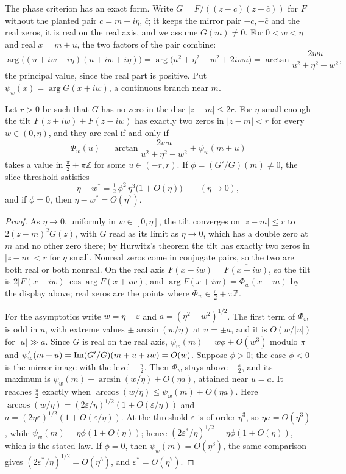 The phase criterion has an exact form. Write $G=F/((z-c)(z-\bar c))$ for $F$ without the planted pair $c=m+i\eta$, $\bar c$; it keeps the mirror pair $-c,-\bar c$ and the real zeros, it is real on the real axis, and we assume $G(m)\ne0$. For $0<w<\eta$ and real $x=m+u$, the two factors of the pair combine:
\[
\arg\big((u+iw-i\eta)(u+iw+i\eta)\big)=\arg\big(u^2+\eta^2-w^2+2iwu\big)=\arctan\frac{2wu}{u^2+\eta^2-w^2},
\]
the principal value, since the real part is positive. Put $\psi_w(x)=\arg G(x+iw)$, a continuous branch near $m$.

\begin{theorem}\label{cm:thm:exact}
Let $r>0$ be such that $G$ has no zero in the disc $|z-m|\le2r$. For $\eta$ small enough the tilt $F(z+iw)+F(z-iw)$ has exactly two zeros in $|z-m|<r$ for every $w\in(0,\eta)$, and they are real if and only if
\[
\Phi_w(u)=\arctan\frac{2wu}{u^2+\eta^2-w^2}+\psi_w(m+u)
\]
takes a value in $\frac\pi2+\pi\mathbb Z$ for some $u\in(-r,r)$. If $\phi=(G'/G)(m)\ne0$, the slice threshold satisfies
\[
\eta-w^*=\tfrac12\,\phi^2\,\eta^3\big(1+O(\eta)\big)\qquad(\eta\to0),
\]
and if $\phi=0$, then $\eta-w^*=O(\eta^7)$.
\end{theorem}

\begin{proof}
As $\eta\to0$, uniformly in $w\in[0,\eta]$, the tilt converges on $|z-m|\le r$ to $2(z-m)^2G(z)$, with $G$ read as its limit as $\eta\to0$, which has a double zero at $m$ and no other zero there; by Hurwitz's theorem the tilt has exactly two zeros in $|z-m|<r$ for $\eta$ small. Nonreal zeros come in conjugate pairs, so the two are both real or both nonreal. On the real axis $F(x-iw)=\overline{F(x+iw)}$, so the tilt is $2|F(x+iw)|\cos\arg F(x+iw)$, and $\arg F(x+iw)=\Phi_w(x-m)$ by the display above; real zeros are the points where $\Phi_w\in\frac\pi2+\pi\mathbb Z$.

For the asymptotics write $w=\eta-\varepsilon$ and $a=(\eta^2-w^2)^{1/2}$. The first term of $\Phi_w$ is odd in $u$, with extreme values $\pm\arcsin(w/\eta)$ at $u=\pm a$, and it is $O(w/|u|)$ for $|u|\gg a$. Since $G$ is real on the real axis, $\psi_w(m)=w\phi+O(w^3)$ modulo $\pi$ and $\psi_w'(m+u)=\operatorname{Im}(G'/G)(m+u+iw)=O(w)$. Suppose $\phi>0$; the case $\phi<0$ is the mirror image with the level $-\frac\pi2$. Then $\Phi_w$ stays above $-\frac\pi2$, and its maximum is $\psi_w(m)+\arcsin(w/\eta)+O(\eta a)$, attained near $u=a$. It reaches $\frac\pi2$ exactly when $\arccos(w/\eta)\le\psi_w(m)+O(\eta a)$. Here $\arccos(w/\eta)=(2\varepsilon/\eta)^{1/2}(1+O(\varepsilon/\eta))$ and $a=(2\eta\varepsilon)^{1/2}(1+O(\varepsilon/\eta))$. At the threshold $\varepsilon$ is of order $\eta^3$, so $\eta a=O(\eta^3)$, while $\psi_w(m)=\eta\phi(1+O(\eta))$; hence $(2\varepsilon^*/\eta)^{1/2}=\eta\phi(1+O(\eta))$, which is the stated law. If $\phi=0$, then $\psi_w(m)=O(\eta^3)$, the same comparison gives $(2\varepsilon^*/\eta)^{1/2}=O(\eta^3)$, and $\varepsilon^*=O(\eta^7)$.
\end{proof}

